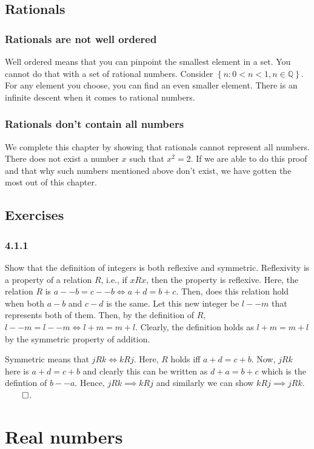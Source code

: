 \documentclass{report}
\begin{document}
\section{Rationals}
\subsection*{Rationals are not well ordered}
Well ordered means that you can pinpoint the smallest element in a set. You cannot do that with a set of rational numbers. Consider $\left\{ n: 0 < n < 1, n \in \mathbb{Q} \right\} $. For any element you choose, you can find an even smaller element. There is an infinite descent when it comes to rational numbers.

\subsection*{Rationals don't contain all numbers}
We complete this chapter by showing that rationals cannot represent all numbers. There does not exist a number $x$ such that  $x^2 = 2$. If we are able to do this proof and that why such numbers mentioned above don't exist, we have gotten the most out of this chapter. 




\section*{Exercises}
\subsection*{4.1.1} Show that the definition of integers is both reflexive and symmetric. Reflexivity is a property of a relation $R$, i.e., if  $xRx$, then the property is reflexive. Here, the relation $R$ is  $a--b = c--b \iff a+d = b+c$. Then, does this relation hold when both  $a-b$ and  $c-d$ is the same. Let this new integer be  $l--m$ that represents both of them. Then, by the definition of  $R$,  $l--m = l--m \iff l+m = m +l$. Clearly, the definition holds as  $l+m=m+l$ by the symmetric property of addition. 

Symmetric means that $jRk \iff kRj$. Here, $R$ holds  iff $a+d=c+b$. Now, $jRk$ here is  $a+d=c+b$ and clearly  this can be written as  $d+a=b+c$ which is the defintion of  $b--a$. Hence,  $jRk \implies kRj$ and similarly we can show  $kRj \implies jRk$. $\qed$. 



\chapter{Real numbers}
\end{document}
